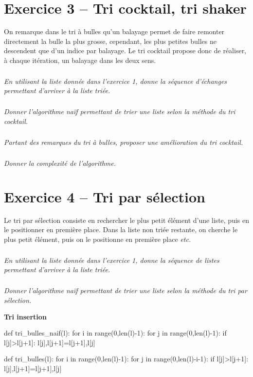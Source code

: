 \documentclass[10pt,fleqn]{article} %
\begin{document}
\begin{multicols}{2}
\section*{Exercice 3 -- Tri cocktail, tri shaker}
On remarque dans le tri à bulles qu'un balayage permet de faire remonter directement la bulle la plus grosse, cependant, les plus petites bulles ne descendent que d'un indice par balayage. Le tri cocktail propose donc de réaliser, à chaque itération, un balayage dans les deux sens. 
\setcounter{exo}{0}
\subparagraph{}
\textit{En utilisant la liste donnée dans l'exercice 1, donne la séquence d'échanges permettant d'arriver à la liste triée.}

\subparagraph{}
\textit{Donner l'algorithme naïf permettant de trier une liste selon la méthode du tri cocktail.}
\ifprof
\begin{corrige}
\end{corrige}
\else
\fi

\subparagraph{}
\textit{Partant des remarques du tri à bulles, proposer une amélioration du tri cocktail.}

\subparagraph{}
\textit{Donner la complexité de l'algorithme.}



\ifprof

\else
\fi
\section*{Exercice 4 -- Tri par sélection}
Le tri par sélection consiste en rechercher le plus petit élément d'une liste, puis en le positionner en première place. Dans la liste non triée restante, on cherche le plus petit élément, puis on le positionne en première place \textit{etc.}
\setcounter{exo}{0}
\subparagraph{}
\textit{En utilisant la liste donnée dans l'exercice 1, donne la séquence de listes permettant d'arriver à la liste triée.}

\subparagraph{}
\textit{Donner l'algorithme naïf permettant de trier une liste selon la méthode du tri par sélection.}


\end{multicols}

\newpage

\noindent\textbf{Tri insertion}
\begin{python}
def tri_bulles_naif(l):
    for i in range(0,len(l)-1):
        for j in range(0,len(l)-1):
            if l[j]>l[j+1]:
                l[j],l[j+1]=l[j+1],l[j]


def tri_bulles(l):
    for i in range(0,len(l)-1):
        for j in range(0,len(l)-i-1):
            if l[j]>l[j+1]:
                l[j],l[j+1]=l[j+1],l[j]
\end{python}
\end{document}

